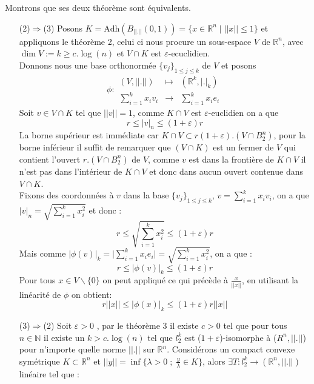 \documentclass{report}
\begin{document}
\noindent Montrons que ses deux théorème sont équivalents.
\begin{enumerate}[leftmargin=\labelsep]
	\item[(2)$\Rightarrow$(3)]
	Posons $K=\text{Adh}(B_{||.||}(0,1))=\{x\in  \mathbb{R}^n \; | \; ||x||\leq 1 \}$ et appliquons le théorème 2, celui ci nous procure un sous-espace $V$ de $\mathbb{R}^n$, avec $\dim V := k \geq c.\log(n)$ et $V\cap K$ est $\varepsilon\text{-ecuclidien}$.\\
	Donnons nous une base orthonormée $\{v_j\}_{1\leq j \leq k}$ de $V$ et posons 
	\begin{equation*}
	\phi :\begin{array}{ccc}
	(V,||.||) & \mapsto &(\mathbb{R}^k,|.|_k) \\
	\sum_{i=1}^{k}x_i v_i & \to & \sum_{i=1}^{k}x_i e_i
	\end{array}
	\end{equation*}
	Soit $v\in V\cap K$ tel que $||v||=1$, comme $K\cap V$ est $\varepsilon$-euclidien on a que 
	\begin{equation*}
	r \leq |v|_n \leq (1+\varepsilon)r
	\end{equation*}
	La borne supérieur est immédiate car  $K\cap V \subset r(1+\varepsilon).(V\cap B^n_2)$, pour la borne inférieur il suffit de remarquer que $(V\cap K)$ est un fermer de $V$ qui contient l'ouvert $r.(V\cap B^n_2)$ de $V$, comme $v$ est dans la frontière de $K\cap V$ il n'est pas dans l'intérieur de $K\cap V$ et donc dans aucun ouvert contenue dans $V\cap K$.\\
	Fixons des coordonnées à $v$ dans la base $\{v_j\}_{1\leq j \leq k}$, $v = \sum_{i=1}^{k}x_iv_i$, on a que $|v|_n = \sqrt{\sum_{i=1}^{k}x_i^2}$ et donc :
	\begin{equation*}
	r \leq \sqrt{\sum_{i=1}^{k}x_i^2} \leq (1+\varepsilon)r
	\end{equation*}
	Mais comme $|\phi(v)|_k = \big|\sum_{i=1}^{k}x_i e_i \big| = \sqrt{\sum_{i=1}^{k}x_i^2}$, on a que :
	\begin{equation*}
	r \leq |\phi(v)|_k \leq (1+\varepsilon)r
	\end{equation*}
	Pour tous $x\in  V\backslash\{0\}$ on peut appliqué ce qui précède à $\frac{x}{||x||}$, en utilisant la linéarité de $\phi$ on obtient:
	\begin{equation*}
	r||x||  \leq |\phi(x)|_k \leq (1+\varepsilon)r ||x||
	\end{equation*}
	\item[(3)$\Rightarrow$(2)]
	Soit $\varepsilon>0$ , par le théorème 3 il existe $c>0$ tel que pour tous $n\in\mathbb{N}$ il existe un $k>c.\log(n)$ tel que $l_2^k$ est ($1+\varepsilon$)-isomorphe à ($R^n,||.||$) pour n’importe quelle norme $||.||$ sur $\mathbb{R}^n$. Considérons un compact convexe symétrique $K\subset \mathbb{R}^n$ et $||y||=\inf\Big\{\lambda>0\; ;\; \frac{y}{\lambda}\in K\Big\}$, alors $\exists T :l^{k}_2\to(\mathbb{R}^n,||.||)$ linéaire tel que :

\end{enumerate}
\end{document}

